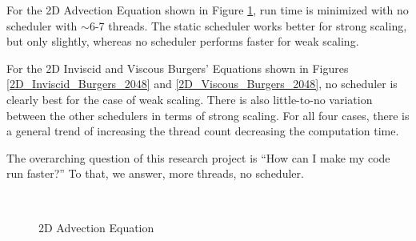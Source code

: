 \documentclass{article}
\begin{document}
For the 2D Advection Equation shown in Figure \ref{2D_Advection_2048}, run time is minimized with no scheduler with $\sim$6-7 threads. The static scheduler works better for strong scaling, but only slightly, whereas no scheduler performs faster for weak scaling.

For the 2D Inviscid and Viscous Burgers' Equations shown in Figures \ref{2D_Inviscid_Burgers_2048} and \ref{2D_Viscous_Burgers_2048}, no scheduler is clearly best for the case of weak scaling. There is also little-to-no variation between the other schedulers in terms of strong scaling. For all four cases, there is a general trend of increasing the thread count decreasing the computation time. 

The overarching question of this research project is ``How can I make my code run faster?'' To that, we answer, more threads, no scheduler.

\begin{figure}[p]
\centering
\captionsetup[subfigure]{labelformat=empty}
\\
\vfill
{}
\caption{2D Advection Equation} 
\label{2D_Advection_2048}
\end{figure}
\end{document}
